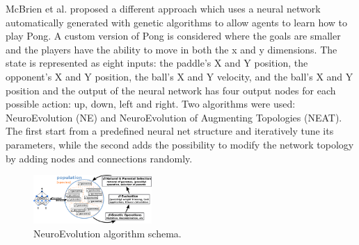 McBrien et al. \cite{mcbrien2020learning} proposed a different approach which uses a neural network automatically generated with genetic algorithms to allow agents to learn how to play Pong.
%
A custom version of Pong is considered where the goals are smaller and the players have the ability to move in both the x and y dimensions.
%
The state is represented as eight inputs: the paddle's X and Y position, the opponent's X and Y position, the ball's X and Y velocity,
and the ball's X and Y position and the output of the neural network has four output nodes for each possible action: up, down, left and right.
%
Two algorithms were used: NeuroEvolution (NE) and NeuroEvolution of Augmenting Topologies (NEAT).
The first start from a predefined neural net structure and iteratively tune its parameters, while the second adds the possibility to modify the network topology by adding nodes and connections randomly.

\begin{figure}[ht]
  \centering
  \includegraphics[width=0.4\textwidth]{images/neuroevolution.png}
  \caption{NeuroEvolution algorithm schema.}
  \label{fig:ne}
\end{figure}
